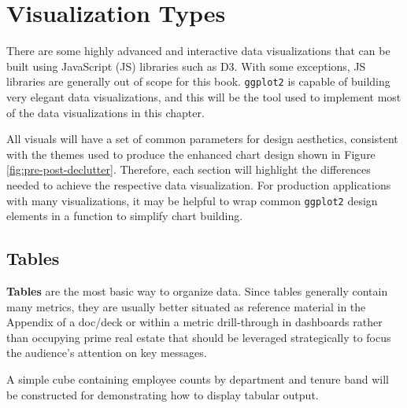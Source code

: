 \documentclass[
]{book}
\begin{document}
\hypertarget{visualization-types}{%
\section{Visualization Types}\label{visualization-types}}

There are some highly advanced and interactive data visualizations that can be built using JavaScript (JS) libraries such as D3. With some exceptions, JS libraries are generally out of scope for this book. \texttt{ggplot2} is capable of building very elegant data visualizations, and this will be the tool used to implement most of the data visualizations in this chapter.

All visuals will have a set of common parameters for design aesthetics, consistent with the themes used to produce the enhanced chart design shown in Figure \ref{fig:pre-post-declutter}. Therefore, each section will highlight the differences needed to achieve the respective data visualization. For production applications with many visualizations, it may be helpful to wrap common \texttt{ggplot2} design elements in a function to simplify chart building.

\hypertarget{tables}{%
\subsection{Tables}\label{tables}}

\textbf{Tables} are the most basic way to organize data. Since tables generally contain many metrics, they are usually better situated as reference material in the Appendix of a doc/deck or within a metric drill-through in dashboards rather than occupying prime real estate that should be leveraged strategically to focus the audience's attention on key messages.

A simple cube containing employee counts by department and tenure band will be constructed for demonstrating how to display tabular output.
\end{document}
